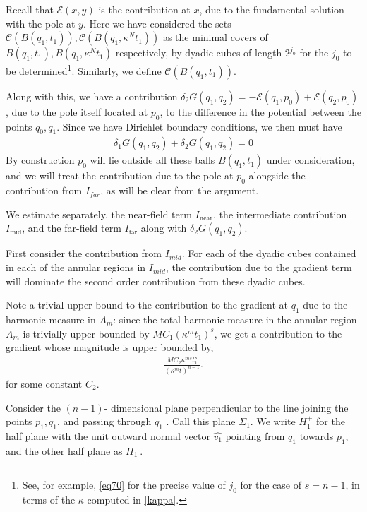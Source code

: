 \documentclass{article}
\theoremstyle{plain}
\theoremstyle{plain}
\theoremstyle{definition}
\theoremstyle{plain}
\begin{document}
 Recall that $\mathcal{E}(x,y)$ is the contribution at $x$, due to the fundamental solution with the pole at $y$. Here we have considered the sets $ \mathcal{C}(B(q_1,t_1)), \mathcal{C}(B(q_1,\kappa^N t_1))$ as the minimal covers of $B(q_1, t_1),B(q_1,\kappa^N t_1)$ respectively, by dyadic cubes of length $2^{j_0}$ for the $j_0$ to be determined\footnote{See, for example, \cref{eq70} for the precise value of $j_0$ for the case of $s=n-1$, in terms of the $\kappa$ computed in \cref{kappa}.}. Similarly, we define $\mathcal{C}(B(q_1,t_1))$.

 Along with this, we have a contribution $\delta_2 G(q_1,q_2)=-\mathcal{E}(q_1,p_0)+\mathcal{E}(q_2,p_0)$, due to the pole itself located at $p_0$, to the difference in the potential between the points $q_0,q_1$. Since we have Dirichlet boundary conditions, we then must have 
 \begin{align}
     \delta_1 G(q_1,q_2)+\delta_2 G(q_1,q_2)=0
 \end{align}
By construction $p_0$ will lie outside all these balls $B(q_1,t_1)$ under consideration, and we will treat the contribution due to the pole at $p_0$ alongside the contribution from $I_{far}$, as will be clear from the argument.
 
 We estimate separately, the near-field term $I_{\mathrm{near}}$,
the intermediate contribution $I_{\mathrm{mid}}$,
and the far-field term $I_{\mathrm{far}}$ along with $\delta_2G(q_1,q_2)$. 
 
First consider the contribution from $I_{mid}$. For each of the dyadic cubes contained in each of the annular regions in $I_{mid}$, the contribution due to the gradient term will dominate the second order contribution from these dyadic cubes.
 
 Note a trivial upper bound to the contribution to the gradient at $q_1$ due to the harmonic measure in $A_m$: since the total harmonic measure in the annular region $A_m$ is trivially upper bounded by $MC_{1} (\kappa^m t_{1})^s$, we get a contribution to the gradient whose magnitude is upper bounded by,
 \begin{align}\label{upperbound}
     \frac{MC_{2} \kappa^{ms} t_{1}^s}{(\kappa^{m} t)^{n-1}}.
 \end{align}
    for some constant $C_2$. 

   Consider the $(n-1)$- dimensional plane perpendicular to the line joining the points $p_1,q_1$, and passing through $q_1$ . Call this plane $\Sigma_1$. We write $H_{1}^{+}$ for the half plane with the unit outward normal vector $\hat{v_1}$ pointing from $q_1$ towards $p_1$, and the other half plane as $H_{1}^{-}$. 
   
\end{document}
